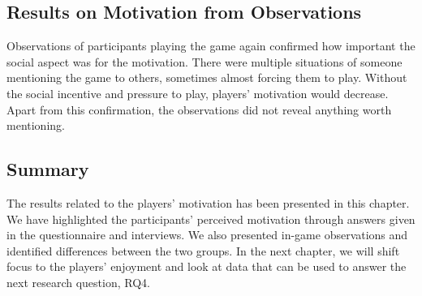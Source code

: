 \subsection{Results on Motivation from Observations}
Observations of participants playing the game again confirmed how important the social aspect was for the motivation. There were multiple situations of someone mentioning the game to others, sometimes almost forcing them to play. Without the social incentive and pressure to play, players’ motivation would decrease. Apart from this confirmation, the observations did not reveal anything worth mentioning.

\subsection{Summary}
The results related to the players’ motivation has been presented in this chapter. We have highlighted the participants' perceived motivation through answers given in the questionnaire and interviews. We also presented in-game observations and identified differences between the two groups. In the next chapter, we will shift focus to the players’ enjoyment and look at data that can be used to answer the next research question, RQ4.
